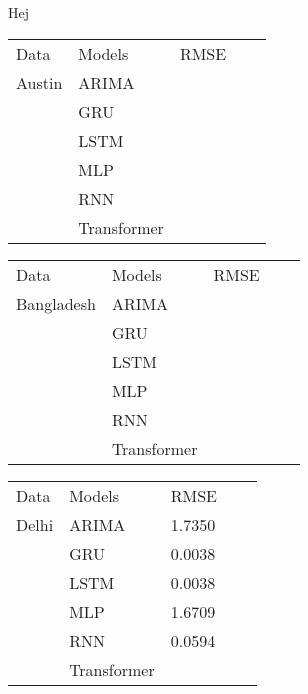 Hej
\label{sec:ExpRes}

\begin{table}[]
\begin{tabular}{|l|l|l|ll}
\cline{1-3}
Data                        & Models      & RMSE   &  &  \\ \cline{1-3}
\multicolumn{1}{|c|}{Austin}& ARIMA       & 	   &  &  \\ \cline{1-3}
                            & GRU         & 	   &  &  \\ \cline{1-3}
                            & LSTM        & 	   &  &  \\ \cline{1-3}
                            & MLP         &        &  &  \\ \cline{1-3}
                            & RNN         & 	   &  &  \\ \cline{1-3}
                            & Transformer &        &  &  \\ \cline{1-3}
\end{tabular}
\end{table}

\begin{table}[]
\begin{tabular}{|l|l|l|ll}
\cline{1-3}
Data                        	 & Models      & RMSE   &  &  \\ \cline{1-3}
\multicolumn{1}{|c|}{Bangladesh} & ARIMA       & 	    &  &  \\ \cline{1-3}
                            	 & GRU         & 	    &  &  \\ \cline{1-3}
                            	 & LSTM        & 	    &  &  \\ \cline{1-3}
                            	 & MLP         &        &  &  \\ \cline{1-3}
                            	 & RNN         & 	    &  &  \\ \cline{1-3}
                            	 & Transformer &        &  &  \\ \cline{1-3}
\end{tabular}
\end{table}

\begin{table}[]
\begin{tabular}{|l|l|l|ll}
\cline{1-3}
Data                        & Models      & RMSE   &  &  \\ \cline{1-3}
\multicolumn{1}{|c|}{Delhi} & ARIMA       & 1.7350 &  &  \\ \cline{1-3}
                            & GRU         & 0.0038 &  &  \\ \cline{1-3}
                            & LSTM        & 0.0038 &  &  \\ \cline{1-3}
                            & MLP         & 1.6709 &  &  \\ \cline{1-3}
                            & RNN         & 0.0594 &  &  \\ \cline{1-3}
                            & Transformer &        &  &  \\ \cline{1-3}
\end{tabular}
\end{table}

